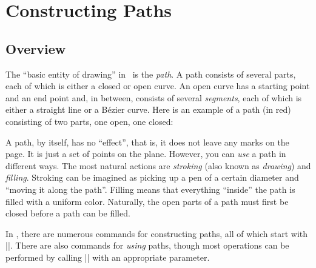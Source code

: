 %
%
%


\section[base-paths]{Constructing Paths}

\subsection{Overview}

The ``basic entity of drawing'' in \pgfname\ is the \emph{path}. A path
consists of several parts, each of which is either a closed or open curve. An
open curve has a starting point and an end point and, in between, consists of
several \emph{segments}, each of which is either a straight line or a Bézier
curve. Here is an example of a path (in red) consisting of two parts, one open,
one closed:
%
\begin{codeexample}[]
\end{codeexample}

A path, by itself, has no ``effect'', that is, it does not leave any marks on
the page. It is just a set of points on the plane. However, you can \emph{use}
a path in different ways. The most natural actions are \emph{stroking} (also
known as \emph{drawing}) and \emph{filling}. Stroking can be imagined as
picking up a pen of a certain diameter and ``moving it along the path''.
Filling means that everything ``inside'' the path is filled with a uniform
color. Naturally, the open parts of a path must first be closed before a path
can be filled.

In \pgfname, there are numerous commands for constructing paths, all of which
start with |\pgfpath|. There are also commands for \emph{using} paths, though
most operations can be performed by calling |\pgfusepath| with an appropriate
parameter.

